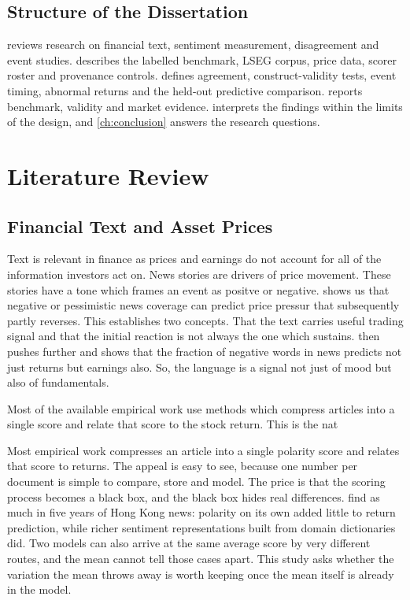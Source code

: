 \documentclass[11pt,a4paper,oneside]{book}
\let\textcite\citet
\let\Textcite\Citet
\begin{document}
\section{Structure of the Dissertation}
\label{sec:outline}

 reviews research on financial text, sentiment measurement, disagreement and event studies.
 describes the labelled benchmark, LSEG corpus, price data, scorer roster and provenance controls.
 defines agreement, construct-validity tests, event timing, abnormal returns and the held-out predictive comparison.
 reports benchmark, validity and market evidence.
 interprets the findings within the limits of the design, and \cref{ch:conclusion} answers the research questions.

\chapter{Literature Review}
\label{ch:literature}

\section{Financial Text and Asset Prices}
\label{sec:lit-financial-text}

Text is relevant in finance as prices and earnings do not account for all of the information investors act on.
News stories are drivers of price movement. These stories have a tone which frames an event as positve or negative.
\textcite{tetlock2007} shows us that negative or pessimistic news coverage can predict price pressur that subsequently partly reverses.
This establishes two concepts. That the text carries useful trading signal and that the initial reaction is not always the one which sustains.
\textcite{tetlock2008words} then pushes further and shows that the fraction of negative words in news predicts not just returns but earnings also.
So, the language is a signal not just of mood but also of fundamentals.

Most of the available empirical work use methods which compress articles into a single score and relate that score to the stock return.
This is the nat

Most empirical work compresses an article into a single polarity score and relates that score to returns.
The appeal is easy to see, because one number per document is simple to compare, store and model.
The price is that the scoring process becomes a black box, and the black box hides real differences.
\Textcite{li2014news} find as much in five years of Hong Kong news: polarity on its own added little to return prediction, while richer sentiment representations built from domain dictionaries did.
Two models can also arrive at the same average score by very different routes, and the mean cannot tell those cases apart.
This study asks whether the variation the mean throws away is worth keeping once the mean itself is already in the model.
\end{document}
